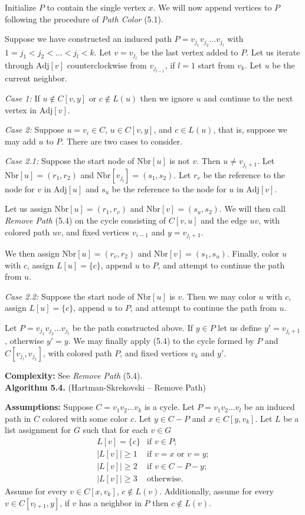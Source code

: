 \documentclass[letterpaper, 12pt]{article}
\theoremstyle{definition}
\theoremstyle{definition}
\theoremstyle{thm}
\theoremstyle{definition}
\begin{document}
Initialize $P$ to contain the single vertex $x$. We will now
append vertices to $P$ following the procedure of \textit{Path Color} (5.1).

Suppose we have constructed an induced path $P=v_{j_1}v_{j_2}\ldots v_{j_l}$
with $1=j_1<j_2<\ldots<j_l< k$. Let $v=v_{j_l}$ be the last vertex added to $P$.
Let us iterate through $\text{Adj}[v]$ counterclockwise from $v_{j_{l-1}}$, if
$l=1$ start from $v_k$. Let $u$ be the current neighbor.

\textit{Case 1:} If $u\not\in C[v,y]$ or $c\not\in L(u)$ then we ignore $u$ and
continue to the next vertex in $\text{Adj}[v]$.

\textit{Case 2:} Suppose $u=v_i\in C$,
$u\in C[v,y]$, and $c\in L(u)$, that is, suppose we may add $u$ to $P$.
There are two cases to consider.

\textit{Case 2.1:} Suppose the start node of $\text{Nbr}[u]$ is not $v$. Then
$u\ne v_{j_l +1}$. Let $\text{Nbr}[u]=(r_1,r_2)$ and
$\text{Nbr}[v_{j_l}]=(s_1,s_2)$. Let $r_v$ be the reference to the node for
$v$ in $\text{Adj}[u]$ and $s_u$ be the reference to the node for $u$ in
$\text{Adj}[v]$.

Let us assign $\text{Nbr}[u]=(r_1,r_v)$ and $\text{Nbr}[v]=(s_u,s_2)$. We will
then call \textit{Remove Path} (5.4) on the cycle consisting of $C[v,u]$ and the
edge $uv$, with colored path $uv$, and fixed vertices $v_{i-1}$ and
$y=v_{j_l+1}$.

We then assign $\text{Nbr}[u]=(r_v,r_2)$ and $\text{Nbr}[v]=(s_1,s_u)$. Finally,
color $u$ with $c$, assign $L[u]=\{c\}$, append $u$ to $P$, and attempt to
continue the path from $u$.

\textit{Case 2.2:} Suppose the start node of $\text{Nbr}[u]$ is $v$. Then we may
color $u$ with $c$, assign $L[u]=\{c\}$, append $u$ to $P$, and attempt to
continue the path from $u$.

Let $P=v_{j_1}v_{j_2}\ldots v_{j_l}$ be the path constructed above.
If $y\in P$ let us define $y'=v_{j_l+1}$, otherwise $y'=y$.
We may finally apply  (5.4) to the cycle formed by $P$ and
$C[v_{j_l},v_{j_1}]$, with colored path $P$, and fixed
vertices $v_k$ and $y'$.

\noindent\textbf{Complexity:} See \textit{Remove Path} (5.4).\\

\noindent\textbf{Algorithm 5.4.} (Hartman-Skrekovski -- Remove Path)

\noindent\textbf{Assumptions:} Suppose $C=v_1v_2\ldots v_k$ is a cycle. Let
$P=v_1v_2\ldots v_l$ be an induced path in $C$ colored with some color $c$. Let
$y\in C-P$ and $x\in C[y,v_k]$. Let $L$ be a list assignment for $G$ such that
for each $v\in G$
\[
    \begin{array}{ll}
        L[v]=\{c\} & \text{if } v\in P;\\
	    |L[v]|\ge 1 & \text{if } v=x \text{ or } v=y;\\
	    |L[v]|\ge 2 & \text{if } v\in C-P-y;\\
	    |L[v]|\ge 3 & \text{otherwise.}
    \end{array}
\]
Assume for every $v\in C[x,v_k]$, $c\not\in L(v)$. Additionally, assume for
every $v\in C[v_{l+1},y]$, if $v$ has a neighbor in $P$ then $c\not\in L(v)$.
\end{document}

